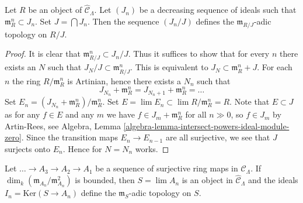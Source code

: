 \begin{lemma}
\label{lemma-m-adic-topology}
Let $R$ be an object of $\widehat{\mathcal{C}}_\Lambda$. Let $(J_n)$ be a
decreasing sequence of ideals such that $\mathfrak m_R^n \subset J_n$.
Set $J = \bigcap J_n$. Then the sequence $(J_n/J)$ defines the
$\mathfrak m_{R/J}$-adic topology on $R/J$.
\end{lemma}

\begin{proof}
It is clear that $\mathfrak m_{R/J}^n \subset J_n/J$. Thus it suffices
to show that for every $n$ there exists an $N$ such that
$J_N/J \subset \mathfrak m_{R/J}^n$. This is equivalent to
$J_N \subset \mathfrak m_R^n + J$. For each $n$ the ring $R/\mathfrak m_R^n$
is Artinian, hence there exists a $N_n$ such that
$$
J_{N_n} + \mathfrak m_R^n = J_{N_n + 1} + \mathfrak m_R^n = \ldots
$$
Set $E_n = (J_{N_n} + \mathfrak m_R^n)/\mathfrak m_R^n$.
Set $E = \lim E_n \subset \lim R/\mathfrak m_R^n = R$.
Note that $E \subset J$ as for any $f \in E$ and any $m$
we have $f \in J_m + \mathfrak m_R^n$ for all $n \gg 0$, so
$f \in J_m$ by Artin-Rees, see
Algebra, Lemma \ref{algebra-lemma-intersect-powers-ideal-module-zero}.
Since the transition maps $E_n \to E_{n - 1}$ are all surjective,
we see that $J$ surjects onto $E_n$. Hence for $N = N_n$ works.
\end{proof}

\begin{lemma}
\label{lemma-limit-artinian}
Let $\ldots \to A_3 \to A_2 \to A_1$ be a sequence of surjective
ring maps in $\mathcal{C}_\Lambda$. If
$\dim_k (\mathfrak m_{A_n}/\mathfrak m_{A_n}^2)$ is bounded, then
$S = \lim A_n$ is an object in $\widehat{\mathcal{C}}_\Lambda$
and the ideals $I_n = \text{Ker}(S \to A_n)$ define the
$\mathfrak m_S$-adic topology on $S$.
\end{lemma}

